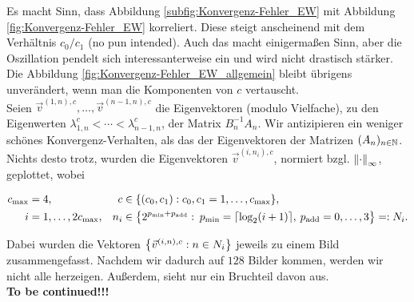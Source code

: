 Es macht Sinn, dass Abbildung \ref{subfig:Konvergenz-Fehler_EW} mit Abbildung \ref{fig:Konvergenz-Fehler_EW} korreliert. Diese  steigt anscheinend mit dem Verhältnis $c_0/c_1$ (no pun intended). Auch das macht einigermaßen Sinn, aber die Oszillation pendelt sich interessanterweise ein und wird nicht drastisch stärker. Die Abbildung \ref{fig:Konvergenz-Fehler_EW_allgemein} bleibt übrigens unverändert, wenn man die Komponenten von $c$ vertauscht. \\

Seien  $\vec v^{(1, n), c}, \ldots, \vec v^{(n-1, n), c}$ die Eigenvektoren (modulo Vielfache), zu den Eigenwerten $\lambda_{1, n}^c < \cdots < \lambda_{n-1, n}^c$, der Matrix $B_n^{-1} A_n$. Wir antizipieren ein weniger schönes Konvergenz-Verhalten, als das der Eigenvektoren der Matrizen $(A_n)_{n \in \N}$. Nichts desto trotz, wurden die Eigenvektoren $\vec v^{(i, n_i), c}$, normiert bzgl. $\norm[\infty]{\cdot}$, geplottet, wobei

\begin{align*}
  c_{\text{max}} & = 4, &
  c & \in \Bbraces{(c_0, c_1): c_0, c_1 = 1, \ldots, c_{\text{max}}}, \\
  i & = 1, \ldots, 2 c_{\text{max}}, &
  n_i & \in \Bbraces
  {
    2^{p_{\text{min}} + p_{\text{add}}}: \:
    p_{\text{min}} = \ceil{\log_2(i+1)}, \:
    p_{\text{add}} = 0, \ldots, 3
  } =: N_i.
\end{align*}

Dabei wurden die Vektoren $\Bbraces{\vec v^{(i, n), c}: n \in N_i}$ jeweils zu einem Bild zusammengefasst. Nachdem wir dadurch auf $128$ Bilder kommen, werden wir nicht alle herzeigen. Außerdem,  sieht nur ein Bruchteil davon  aus. \\

\textbf{To be continued!!!}
